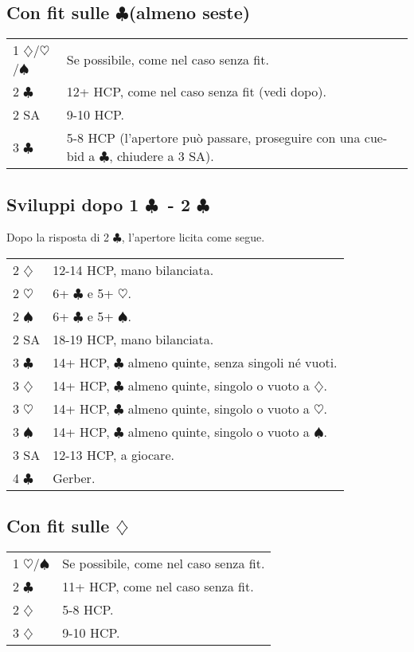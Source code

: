 \documentclass[a4paper,10pt]{article}
\renewcommand{\c}{$\clubsuit$\xspace}
\renewcommand{\d}{$\diamondsuit$\xspace}
\newcommand{\h}{$\heartsuit$\xspace}
\newcommand{\s}{$\spadesuit$\xspace}
\newcommand{\sa}{SA\xspace}
\newcommand{\smallspace}{\vskip0.3cm}
\newenvironment{twocol}
  {\smallspace\noindent\begin{tabular}{l p{0.78\textwidth}}}
  {\end{tabular}\smallspace}
\begin{document}
\subsection{Con fit sulle \c (almeno seste)}

\begin{twocol}
	1 \d/\h/\s & Se possibile, come nel caso senza fit. \\
	2 \c & 12+ HCP, come nel caso senza fit (vedi dopo). \\
	2 \sa & 9-10 HCP.\\
	3 \c & 5-8 HCP (l'apertore può passare, proseguire con una cue-bid a \c, chiudere a 3 \sa).\\
\end{twocol}

\subsection{Sviluppi dopo 1 \c\ - 2 \c} Dopo la risposta di 2 \c, l'apertore licita come segue.

\begin{twocol}
	2 \d & 12-14 HCP, mano bilanciata. \\
	2 \h & 6+ \c e 5+ \h. \\
	2 \s & 6+ \c e 5+ \s. \\
	2 SA & 18-19 HCP, mano bilanciata. \\
	3 \c & 14+ HCP, \c almeno quinte, senza singoli né vuoti. \\
	3 \d & 14+ HCP, \c almeno quinte, singolo o vuoto a \d.\\
	3 \h & 14+ HCP, \c almeno quinte, singolo o vuoto a \h.\\
	3 \s & 14+ HCP, \c almeno quinte, singolo o vuoto a \s.\\
	3 \sa & 12-13 HCP, a giocare.\\
	4 \c & Gerber.
\end{twocol}



\subsection{Con fit sulle \d}

\begin{twocol}
	1 \h/\s & Se possibile, come nel caso senza fit.\\
	2 \c  & 11+ HCP, come nel caso senza fit.\\
	2 \d  & 5-8 HCP.\\
	3 \d  & 9-10 HCP.\\
\end{twocol}
\end{document}
